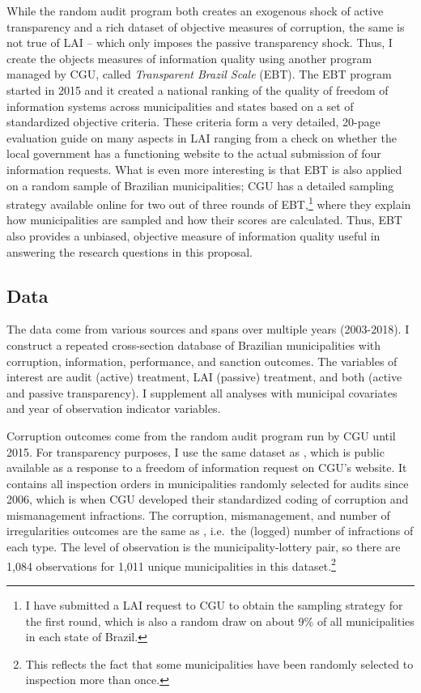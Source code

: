 \documentclass[11pt]{article}
\begin{document}
While the random audit program both creates an exogenous shock of active transparency and a rich dataset of objective measures of corruption, the same is not true of LAI -- which only imposes the passive transparency shock. Thus, I create the objects measures of information quality using another program managed by CGU, called \emph{Transparent Brazil Scale} (EBT). The EBT program started in 2015 and it created a national ranking of the quality of freedom of information systems across municipalities and states based on a set of standardized objective criteria. These criteria form a very detailed, 20-page evaluation guide on many aspects in LAI ranging from a check on whether the local government has a functioning website to the actual submission of four information requests. What is even more interesting is that EBT is also applied on a random sample of Brazilian municipalities; CGU has a detailed sampling strategy available online for two out of three rounds of EBT,\footnote{I have submitted a LAI request to CGU to obtain the sampling strategy for the first round, which is also a random draw on about 9\% of all municipalities in each state of Brazil.} where they explain how municipalities are sampled and how their scores are calculated. Thus, EBT also provides a unbiased, objective measure of information quality useful in answering the research questions in this proposal.

\subsection{Data} \label{subsec:data_paper3}

The data come from various sources and spans over multiple years (2003-2018). I construct a repeated cross-section database of Brazilian municipalities with corruption, information, performance, and sanction outcomes. The variables of interest are audit (active) treatment, LAI (passive) treatment, and both (active and passive transparency). I supplement all analyses with municipal covariates and year of observation indicator variables.

Corruption outcomes come from the random audit program run by CGU until 2015. For transparency purposes, I use the same dataset as \citet{AvisGovernmentAuditsReduce2018}, which is public available as a response to a freedom of information request on CGU's website. It contains all inspection orders in municipalities randomly selected for audits since 2006, which is when CGU developed their standardized coding of corruption and mismanagement infractions. The corruption, mismanagement, and number of irregularities outcomes are the same as \citet{AvisGovernmentAuditsReduce2018}, i.e.~the (logged) number of infractions of each type. The level of observation is the municipality-lottery pair, so there are 1,084 observations for 1,011 unique municipalities in this dataset.\footnote{This reflects the fact that some municipalities have been randomly selected to inspection more than once.}
\end{document}
